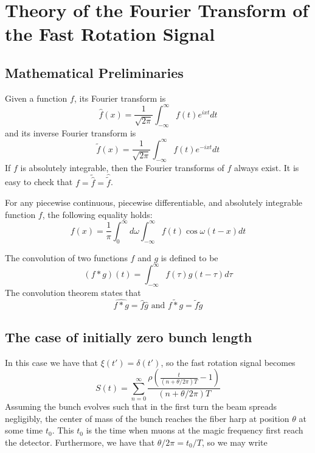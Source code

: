 \newpage
\section{Theory of the Fourier Transform of the Fast Rotation Signal}

\subsection{Mathematical Preliminaries}

\begin{definition}
Given a function $f$, its Fourier transform is \[\hat{f}(x)=\frac{1}{\sqrt{2\pi}}\int^{\infty}_{-\infty}f(t)e^{ixt}dt\] and its inverse Fourier transform is \[\tilde{f}(x)=\frac{1}{\sqrt{2\pi}}\int^{\infty}_{-\infty}f(t)e^{-ixt}dt\] If $f$ is absolutely integrable, then the Fourier transforms of $f$ always exist. It is easy to check that $f=\tilde{\hat{f}}=\hat{\tilde{f}}$.
\end{definition}

\begin{theorem}
For any piecewise continuous, piecewise differentiable, and absolutely integrable function $f$, the following equality holds: \[f(x)=\frac{1}{\pi}\int^{\infty}_0d\omega\int^{\infty}_{-\infty}f(t)\cos\omega(t-x)dt\]
\end{theorem}

\begin{theorem}
The convolution of two functions $f$ and $g$ is defined to be \[(f\ast g)(t)=\int^{\infty}_{-\infty}f(\tau)g(t-\tau)d\tau\] The convolution theorem states that \[\widehat{f\ast g}=\hat{f}\hat{g} \text{ and } \widetilde{f\ast g}=\tilde{f}\tilde{g}\]
\end{theorem} 

\subsection{The case of initially zero bunch length}

In this case we have that $\xi(t')=\delta(t')$, so the fast rotation signal becomes \[S(t)=\sum^{\infty}_{n=0}\frac{\rho\left(\frac{t}{(n+\theta/2\pi)T}-1\right)}{(n+\theta/2\pi)T}\]
Assuming the bunch evolves such that in the first turn the beam spreads negligibly, the center of mass of the bunch reaches the fiber harp at position $\theta$ at some time $t_0$. This $t_0$ is the time when muons at the magic frequency first reach the detector. Furthermore, we have that $\theta/2\pi=t_0/T$, so we may write 


